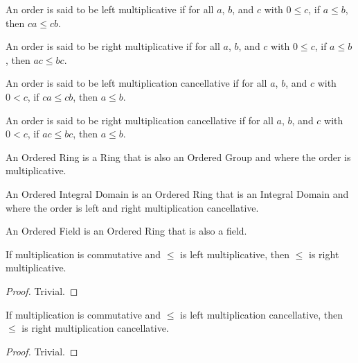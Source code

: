 \documentclass[../math.tex]{subfiles}
\begin{document}
\begin{class}
    An order is said to be left multiplicative if for all $a$, $b$, and $c$ with
    $0 \leq c$, if $a \leq b$, then $ca \leq cb$.
\end{class}

\begin{class}
    An order is said to be right multiplicative if for all $a$, $b$, and $c$
    with $0 \leq c$, if $a \leq b$, then $ac \leq bc$.
\end{class}

\begin{class}
    An order is said to be left multiplication cancellative if for all $a$, $b$,
    and $c$ with $0 < c$, if $ca \leq cb$, then $a \leq b$.
\end{class}

\begin{class}
    An order is said to be right multiplication cancellative if for all $a$,
    $b$, and $c$ with $0 < c$, if $ac \leq bc$, then $a \leq b$.
\end{class}

\begin{class}
    An Ordered Ring is a Ring that is also an Ordered Group and where the order
    is multiplicative.
\end{class}

\begin{class}
    An Ordered Integral Domain is an Ordered Ring that is an Integral Domain and
    where the order is left and right multiplication cancellative.
\end{class}

\begin{class}
    An Ordered Field is an Ordered Ring that is also a field.
\end{class}

\begin{instance}
    If multiplication is commutative and $\leq$ is left multiplicative, then
    $\leq$ is right multiplicative.
\end{instance}
\begin{proof}
    Trivial.
\end{proof}

\begin{instance}
    If multiplication is commutative and $\leq$ is left multiplication
    cancellative, then $\leq$ is right multiplication cancellative.
\end{instance}
\begin{proof}
    Trivial.
\end{proof}
\end{document}
